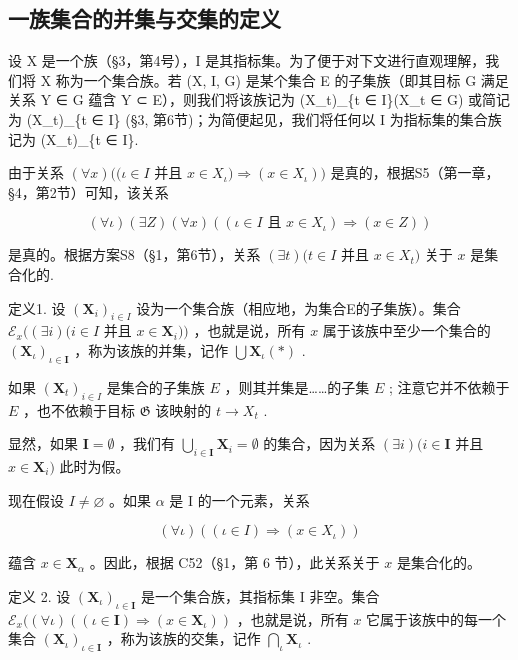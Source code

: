 \subsection{一族集合的并集与交集的定义}

设 X 是一个族（§3，第4号），I 是其指标集。为了便于对下文进行直观理解，我们将 X 称为一个集合族。若 (X, I, G) 是某个集合 E 的子集族（即其目标 G 满足关系 Y ∈ G 蕴含 Y ⊂ E），则我们将该族记为 (X\_t)\_\{t ∈ I\}(X\_t ∈ G) 或简记为 (X\_t)\_\{t ∈ I\} (§3, 第6节)；为简便起见，我们将任何以 I 为指标集的集合族记为 (X\_t)\_\{t ∈ I\}.

由于关系 \((\forall x)((\iota \in I\) 并且 \(x\in X_{\iota})\Longrightarrow (x\in X_{\iota}))\) 是真的，根据S5（第一章，§4，第2节）可知，该关系

\[
(\forall \iota) (\exists Z) (\forall x) ((\iota \in I \text { 且 } x \in X _ {\iota}) \Longrightarrow (x \in Z))
\]

是真的。根据方案S8（§1，第6节），关系 \((\exists t)(t \in I\) 并且 \(x \in X_t)\) 关于 \(x\) 是集合化的.

定义1. 设 \((\mathbf{X}_i)_{i\in I}\) 设为一个集合族（相应地，为集合E的子集族）。集合 \(\mathcal{E}_x((\exists i)(i\in I\) 并且 \(x\in \mathbf{X}_i))\) ，也就是说，所有 \(x\) 属于该族中至少一个集合的 \((\mathbf{X}_{\iota})_{\iota \in \mathbf{I}}\) ，称为该族的并集，记作 \(\bigcup \mathbf{X}_{\iota}(*)\) .

如果 \((\mathbf{X}_t)_{i\in I}\) 是集合的子集族 \(E\) ，则其并集是……的子集 \(E\) ; 注意它并不依赖于 \(E\) ，也不依赖于目标 \(\mathfrak{G}\) 该映射的 \(t\to X_t\) .

显然，如果 \(\mathbf{I} = \emptyset\) ，我们有 \(\bigcup_{i \in \mathbf{I}} \mathbf{X}_i = \emptyset\) 的集合，因为关系 \((\exists i)(i \in \mathbf{I}\) 并且 \(x \in \mathbf{X}_i)\) 此时为假。

现在假设 \(I \neq \varnothing\) 。如果 \(\alpha\) 是 I 的一个元素，关系

\[
(\forall \iota) ((\iota \in I) \Longrightarrow (x \in X _ {\iota}))
\]

蕴含 \(x \in \mathbf{X}_{\alpha}\) 。因此，根据 C52（§1，第 6 节），此关系关于 \(x\) 是集合化的。

定义 2. 设 \((\mathbf{X}_{\iota})_{\iota \in \mathbf{I}}\) 是一个集合族，其指标集 I 非空。集合 \(\mathcal{E}_x((\forall \iota)((\iota \in \mathbf{I}) \Longrightarrow (x \in \mathbf{X}_{\iota}))\) ，也就是说，所有 \(x\) 它属于该族中的每一个集合 \((\mathbf{X}_{\iota})_{\iota \in \mathbf{I}}\) ，称为该族的交集，记作 \(\bigcap_{\iota} \mathbf{X}_{\iota}\) .

